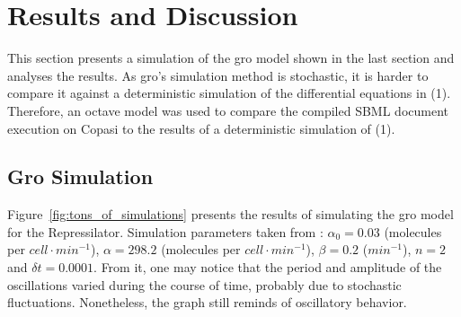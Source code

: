 \documentclass[12pt]{article}
\begin{document}
    
\section{Results and Discussion}


    This section presents a simulation of the gro model shown in the last section and analyses the results. As gro's simulation method is stochastic, it is harder to compare it against a deterministic simulation of the differential equations in (1). Therefore, an octave model was used to compare the compiled SBML document execution on Copasi to the results of a deterministic simulation of (1).
    

\subsection{Gro Simulation}

   Figure~\ref{fig:tons_of_simulations} presents the results of simulating the gro model for the Repressilator. Simulation parameters taken from \cite{ingalls2013mathematical}: $\alpha_{0} = 0.03$ (molecules per $cell \cdot min^{-1}$), $\alpha = 298.2$ (molecules per $cell \cdot min^{-1}$), $\beta = 0.2$ ($min^{-1}$), $n = 2$ and $\delta t = 0.0001$. From it, one may notice that the period and amplitude of the oscillations varied during the course of time, probably due to stochastic fluctuations. Nonetheless, the graph still reminds of oscillatory behavior.
   
\end{document}
